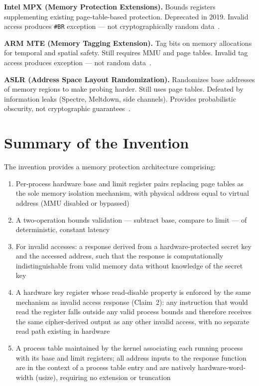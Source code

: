 \documentclass[12pt,letterpaper]{article}
\begin{document}
\textbf{Intel MPX (Memory Protection Extensions).}
Bounds registers supplementing existing page-table-based protection.
Deprecated in 2019.
Invalid access produces \texttt{\#BR} exception ---
not cryptographically random data~\cite{mpx}.

\textbf{ARM MTE (Memory Tagging Extension).}
Tag bits on memory allocations for temporal and spatial safety.
Still requires MMU and page tables.
Invalid tag access produces exception ---
not random data~\cite{arm_mte}.

\textbf{ASLR (Address Space Layout Randomization).}
Randomizes base addresses of memory regions to make probing harder.
Still uses page tables.
Defeated by information leaks (Spectre, Meltdown, side channels).
Provides probabilistic obscurity, not cryptographic guarantees~\cite{pax_aslr,hund_timing}.

\section{Summary of the Invention}

The invention provides a memory protection architecture comprising:

\begin{enumerate}[noitemsep]
  \item Per-process hardware base and limit register pairs replacing page tables
        as the sole memory isolation mechanism, with physical address equal to
        virtual address (MMU disabled or bypassed)

  \item A two-operation bounds validation --- subtract base, compare to limit ---
        of deterministic, constant latency

  \item For invalid accesses: a response derived from a hardware-protected secret
        key and the accessed address, such that the response is computationally
        indistinguishable from valid memory data without knowledge of the secret key

  \item A hardware key register whose read-disable property is enforced by the same
        mechanism as invalid access response (Claim~2): any instruction that would
        read the register falls outside any valid process bounds and therefore
        receives the same cipher-derived output as any other invalid access,
        with no separate read path existing in hardware

  \item A process table maintained by the kernel associating each running process
        with its base and limit registers; all address inputs to the response
        function are in the context of a process table entry and are natively
        hardware-word-width (usize), requiring no extension or truncation
\end{enumerate}
\end{document}
